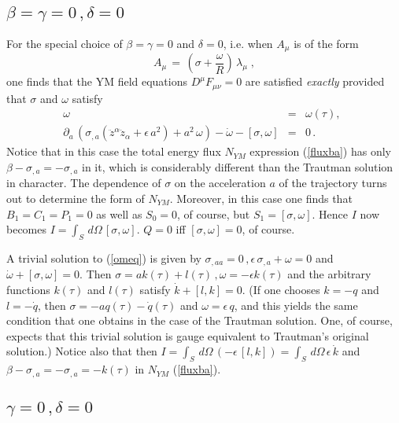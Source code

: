 \documentclass[a4paper,twocolumn,prd,showpacs,amsmath,amssymb]{revtex4}
\begin{document}
\subsection{\label{bg0d0} $\beta=\gamma=0 \, , \delta=0$}

For the special choice of $\beta=\gamma=0$ and $\delta=0$, i.e. when
$A_{\mu}$ is of the form
\begin{equation}
A_{\mu} \, = \, (\sigma + \frac{\omega}{R} ) \, \lambda_{\mu} \; ,
\label{solsecb}
\end{equation}
one finds that the YM field equations $D^{\mu} F_{\mu\nu}=0$ are satisfied
{\it exactly} provided that $\sigma$ and $\omega$ satisfy
\begin{eqnarray}
\omega & = & \omega(\tau) , ~~\label{oot} \\
\partial_{a} \, (\sigma_{,a} (\ddot{z}^{\alpha} \ddot{z}_{\alpha} + \epsilon \, a^2)
+ a^2 \, \omega) - \dot{\omega} - [\sigma,\omega] & = & 0 \, . ~~\label{omeq}
\end{eqnarray}
Notice that in this case the total energy flux $N_{YM}$  expression (\ref{fluxba})
has only $\beta - \sigma_{,a} = - \sigma_{,a}$ in it, which is considerably
different than the Trautman solution in character. The dependence of $\sigma$
on the acceleration $a$ of the trajectory turns out to determine the form of
$N_{YM}$. Moreover, in this case one finds that $B_{1}=C_{1}=P_{1}=0$ as well as
$S_{0}=0$, of course, but $S_{1}=[\sigma,\omega]$. Hence $I$ now becomes
\( I = \int_{S} \, d\Omega \, [\sigma,\omega]\). $Q=0$ iff $[\sigma,\omega]=0$,
of course.

A trivial solution to (\ref{omeq}) is given by \( \sigma_{,aa}=0 \, ,
\epsilon \, \sigma_{,a} + \omega =0 \) and $\dot{\omega} + [\sigma,\omega]=0$.
Then \(\sigma = a k(\tau) + l(\tau) \, , \omega = - \epsilon k(\tau)\) and
the arbitrary functions $k(\tau)$ and $l(\tau)$ satisfy $\dot{k} + [l,k]=0$.
(If one chooses $k=-q$ and $l=-\dot{q}$, then $\sigma = -a q(\tau) - \dot{q}(\tau)$
and $\omega = \epsilon \, q$, and this yields the same condition that one obtains
in the case of the Trautman solution. One, of course, expects that this trivial
solution is gauge equivalent to Trautman's original solution.) Notice also that
then \( I = \int_{S} \, d\Omega \, (- \epsilon \, [l,k]) =
\int_{S} \, d\Omega \, \epsilon \, \dot{k} \) and
$\beta - \sigma_{,a} = - \sigma_{,a} = - k(\tau)$ in $N_{YM}$ (\ref{fluxba}).

\subsection{\label{g0d0} $\gamma=0 \, , \delta=0$}
\end{document}
